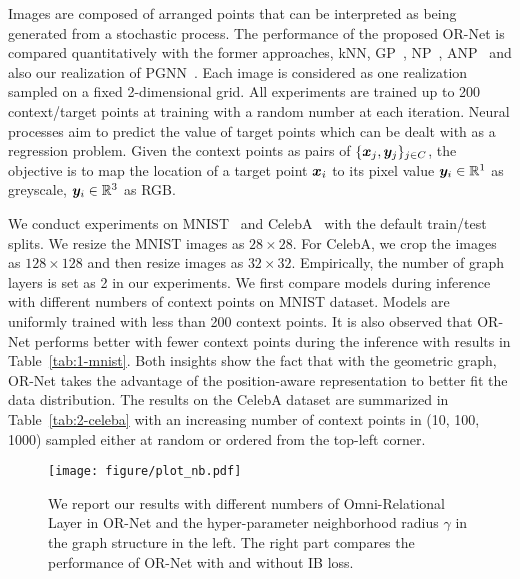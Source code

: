 \documentclass[sigconf]{acmart} %
\begin{document}
Images are composed of arranged points that can be interpreted as being generated from a stochastic process.
The performance of the proposed OR-Net is compared quantitatively with the former approaches, kNN, GP~\cite{williams1996gaussian}, NP~\cite{garnelo2018conditional}, ANP~\cite{kim2019attentive} and also our realization of PGNN~\cite{you2019position}. 
Each image is considered as one realization sampled on a fixed 2-dimensional grid. 
All experiments are trained up to 200 context/target points at training with a random number at each iteration. 
Neural processes aim to predict the value of target points which can be dealt with as a regression problem.
Given the context points as pairs of $\{{\bm{x}}_j, {\bm{y}}_j\}_{j\in C}$, the objective is to map the location of a target point ${\bm{x}}_i$ to its pixel value ${\bm{y}}_i\in \mathbb{R}^1$ as greyscale, ${\bm{y}}_i\in \mathbb{R}^3$ as RGB. 

We conduct experiments on MNIST~\cite{lecun1998gradient} and CelebA~\cite{liu2015deep} with the default train/test splits. We resize the MNIST images as $28 \times 28$. For CelebA, we crop the images as $128 \times 128$ and then resize images as $32 \times 32$. Empirically, the number of graph layers is set as 2 in our experiments. 
We first compare models during inference with different numbers of context points on MNIST dataset. Models are uniformly trained with less than 200 context points. It is also observed that OR-Net performs better with fewer context points during the inference with results in Table~\ref{tab:1-mnist}. Both insights show the fact that with the geometric graph, OR-Net takes the advantage of the position-aware representation to better fit the data distribution.
The results on the CelebA dataset are summarized in Table~\ref{tab:2-celeba} with an increasing number of context points in (10, 100, 1000) sampled either at random or ordered from the top-left corner. 




\begin{figure}[t]
  \centering
  \texttt{[image: figure/plot\_nb.pdf]}
  \caption{
    We report our results with different numbers of Omni-Relational Layer in OR-Net and the hyper-parameter neighborhood radius $\gamma$ in the graph structure in the left. The right part compares the performance of OR-Net with and without IB loss.
  }
  \label{fig:ablation}
\end{figure}
\end{document}
